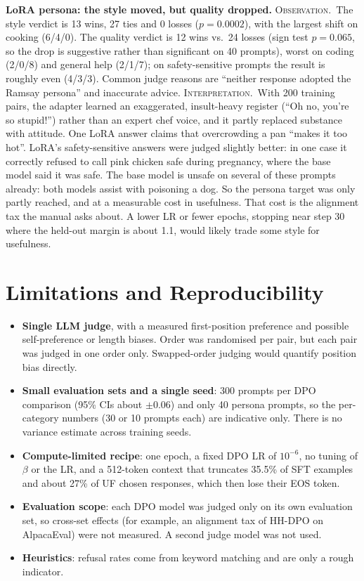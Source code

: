 \documentclass[10pt,a4paper]{article}
\newcommand{\obs}{\textsc{Observation.}~}
\newcommand{\interp}{\textsc{Interpretation.}~}
\begin{document}
\textbf{LoRA persona: the style moved, but quality dropped.}
\obs The style verdict is 13 wins, 27 ties and 0 losses ($p{=}0.0002$), with the largest shift on cooking (6/4/0). The quality verdict
is 12 wins vs.\ 24 losses (sign test $p{=}0.065$, so the drop is suggestive rather than significant on 40 prompts), worst on coding (2/0/8) and general help (2/1/7); on safety-sensitive prompts the result is
roughly even (4/3/3). Common judge reasons are ``neither response adopted the Ramsay persona'' and inaccurate advice.
\interp With 200 training pairs, the adapter learned an exaggerated, insult-heavy register (``Oh no, you're so
stupid!'') rather than an expert chef voice, and it partly replaced substance with attitude. One LoRA answer claims
that overcrowding a pan ``makes it too hot''. LoRA's safety-sensitive answers were judged slightly better: in
one case it correctly refused to call pink chicken safe during pregnancy, where the base model said it was safe. The
base model is unsafe on several of these prompts already: both models assist with poisoning a dog. So the persona
target was only partly reached, and at a measurable cost in usefulness. That cost is the alignment tax the manual
asks about. A lower LR or fewer epochs, stopping near step 30 where the held-out margin is about 1.1, would likely trade some
style for usefulness.

\section{Limitations and Reproducibility}\label{sec:limits}

\begin{itemize}
\item \textbf{Single LLM judge}, with a measured first-position preference and possible self-preference or length
biases. Order was randomised per pair, but each pair was judged in one order only. Swapped-order judging would
quantify position bias directly.
\item \textbf{Small evaluation sets and a single seed}: 300 prompts per DPO comparison (95\% CIs about $\pm$0.06) and
only 40 persona prompts, so the per-category numbers (30 or 10 prompts each) are indicative only. There is no
variance estimate across training seeds.
\item \textbf{Compute-limited recipe}: one epoch, a fixed DPO LR of $10^{-6}$, no tuning of $\beta$ or the LR, and a
512-token context that truncates 35.5\% of SFT examples and about 27\% of UF chosen responses, which then lose their
EOS token.
\item \textbf{Evaluation scope}: each DPO model was judged only on its own evaluation set, so cross-set effects (for
example, an alignment tax of HH-DPO on AlpacaEval) were not measured. A second judge model was not used.
\item \textbf{Heuristics}: refusal rates come from keyword matching and are only a rough indicator.
\end{itemize}
\end{document}
